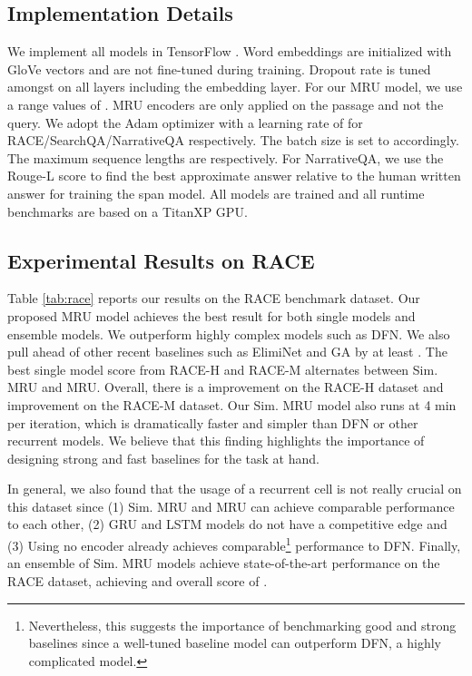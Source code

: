 \documentclass{article}
\begin{document}
\subsection{Implementation Details}
We implement all models in TensorFlow \cite{tensorflow2015-whitepaper}. Word embeddings are initialized with  GloVe \cite{DBLP:conf/emnlp/PenningtonSM14} vectors and are not fine-tuned during training. Dropout rate is tuned amongst  on all layers including the embedding layer. For our MRU model, we use a range values of . MRU encoders are only applied on the passage and not the query. We adopt the Adam optimizer \cite{DBLP:journals/corr/KingmaB14} with a learning rate of  for RACE/SearchQA/NarrativeQA respectively. The batch size is set to  accordingly. The maximum sequence lengths are  respectively. For NarrativeQA, we use the Rouge-L score to find the best approximate answer relative to the human written answer for training the span model. All models are trained and all runtime benchmarks are based on a TitanXP GPU. 


\subsection{Experimental Results on RACE}
Table \ref{tab:race} reports our results on the RACE benchmark dataset. Our proposed MRU model achieves the best result for both single models and ensemble models. We outperform highly complex models such as DFN. We also pull ahead of other recent baselines such as ElimiNet and GA by at least . The best single model score from RACE-H and RACE-M alternates between Sim. MRU and MRU. Overall, there is a  improvement on the RACE-H dataset and  improvement on the RACE-M dataset. Our Sim. MRU model also runs at 4 min per iteration, which is dramatically faster and simpler than DFN or other recurrent models. We believe that this finding highlights the importance of designing strong and fast baselines for the task at hand. 

In general, we also found that the usage of a recurrent cell is not really crucial on this dataset since (1) Sim. MRU and MRU can achieve comparable performance to each other, (2) GRU and LSTM models do not have a competitive edge and (3) Using no encoder already achieves comparable\footnote{Nevertheless, this suggests the importance of benchmarking good and strong baselines since a well-tuned baseline model can outperform DFN, a highly complicated model. } performance to DFN. Finally, an ensemble of Sim. MRU models achieve state-of-the-art performance on the RACE dataset, achieving and overall score of . 
\end{document}
